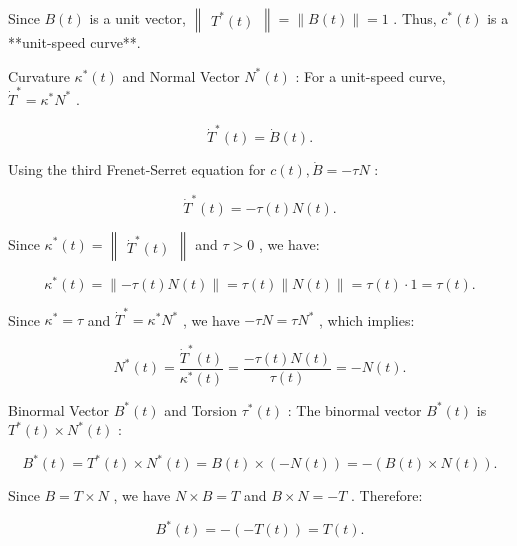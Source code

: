 \documentclass[10pt]{article}
\begin{document}
Since \(B\left( t\right)\) is a unit vector, \(\begin{Vmatrix}{{T}^{ * }\left( t\right) }\end{Vmatrix} = \parallel B\left( t\right) \parallel  = 1\) . Thus, \({c}^{ * }\left( t\right)\) is a **unit-speed curve**.

Curvature \({\kappa }^{ * }\left( t\right)\) and Normal Vector \({N}^{ * }\left( t\right)\) : For a unit-speed curve, \({\dot{T}}^{ * } = {\kappa }^{ * }{N}^{ * }\) .

\[
{\dot{T}}^{ * }\left( t\right)  = \dot{B}\left( t\right) .
\]

Using the third Frenet-Serret equation for \(c\left( t\right) ,\dot{B} =  - {\tau N}\) :

\[
{\dot{T}}^{ * }\left( t\right)  =  - \tau \left( t\right) N\left( t\right) .
\]

Since \({\kappa }^{ * }\left( t\right)  = \begin{Vmatrix}{{\dot{T}}^{ * }\left( t\right) }\end{Vmatrix}\) and \(\tau  > 0\) , we have:

\[
{\kappa }^{ * }\left( t\right)  = \parallel  - \tau \left( t\right) N\left( t\right) \parallel  = \tau \left( t\right) \parallel N\left( t\right) \parallel  = \tau \left( t\right)  \cdot  1 = \tau \left( t\right) .
\]

Since \({\kappa }^{ * } = \tau\) and \({\dot{T}}^{ * } = {\kappa }^{ * }{N}^{ * }\) , we have \(- {\tau N} = \tau {N}^{ * }\) , which implies:

\[
{N}^{ * }\left( t\right)  = \frac{{\dot{T}}^{ * }\left( t\right) }{{\kappa }^{ * }\left( t\right) } = \frac{-\tau \left( t\right) N\left( t\right) }{\tau \left( t\right) } =  - N\left( t\right) .
\]

Binormal Vector \({B}^{ * }\left( t\right)\) and Torsion \({\tau }^{ * }\left( t\right)\) : The binormal vector \({B}^{ * }\left( t\right)\) is \({T}^{ * }\left( t\right)  \times  {N}^{ * }\left( t\right)\) :

\[
{B}^{ * }\left( t\right)  = {T}^{ * }\left( t\right)  \times  {N}^{ * }\left( t\right)  = B\left( t\right)  \times  \left( {-N\left( t\right) }\right)  =  - \left( {B\left( t\right)  \times  N\left( t\right) }\right) .
\]

Since \(B = T \times  N\) , we have \(N \times  B = T\) and \(B \times  N =  - T\) . Therefore:

\[
{B}^{ * }\left( t\right)  =  - \left( {-T\left( t\right) }\right)  = T\left( t\right) .
\]
\end{document}

